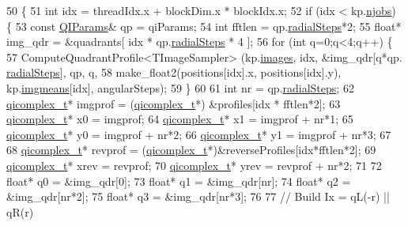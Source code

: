 \begin{DoxyCode}
50 \{
51     \textcolor{keywordtype}{int} idx = threadIdx.x + blockDim.x * blockIdx.x;
52     \textcolor{keywordflow}{if} (idx < kp.\hyperlink{struct_base_kernel_params_aec40d44810d0e0a6640c66038af1fbf2}{njobs}) \{
53         \textcolor{keyword}{const} \hyperlink{struct_q_i_params}{QIParams}& qp = qiParams;
54         \textcolor{keywordtype}{int} fftlen = qp.\hyperlink{struct_q_i_params_a19b7d550113364de4e4f11e2c9cfea0e}{radialSteps}*2;
55         \textcolor{keywordtype}{float}* img\_qdr = &quadrants[ idx * qp.\hyperlink{struct_q_i_params_a19b7d550113364de4e4f11e2c9cfea0e}{radialSteps} * 4 ];
56         \textcolor{keywordflow}{for} (\textcolor{keywordtype}{int} q=0;q<4;q++) \{
57             ComputeQuadrantProfile<TImageSampler> (kp.\hyperlink{struct_base_kernel_params_abdd6b8722cb871a13069ba0e3cd3ab0b}{images}, idx, &img\_qdr[q*qp.
      \hyperlink{struct_q_i_params_a19b7d550113364de4e4f11e2c9cfea0e}{radialSteps}], qp, q, 
58                 make\_float2(positions[idx].x, positions[idx].y), kp.\hyperlink{struct_base_kernel_params_aa0c58be6d25ab55207ca83bb0047f4d9}{imgmeans}[idx], angularSteps);
59         \}
60 
61         \textcolor{keywordtype}{int} nr = qp.\hyperlink{struct_q_i_params_a19b7d550113364de4e4f11e2c9cfea0e}{radialSteps};
62         \hyperlink{_q_i_8h_ad57806420787f160bbbe768dbd72d115}{qicomplex\_t}* imgprof = (\hyperlink{_q_i_8h_ad57806420787f160bbbe768dbd72d115}{qicomplex\_t}*) &profiles[idx * fftlen*2];
63         \hyperlink{_q_i_8h_ad57806420787f160bbbe768dbd72d115}{qicomplex\_t}* x0 = imgprof;
64         \hyperlink{_q_i_8h_ad57806420787f160bbbe768dbd72d115}{qicomplex\_t}* x1 = imgprof + nr*1;
65         \hyperlink{_q_i_8h_ad57806420787f160bbbe768dbd72d115}{qicomplex\_t}* y0 = imgprof + nr*2;
66         \hyperlink{_q_i_8h_ad57806420787f160bbbe768dbd72d115}{qicomplex\_t}* y1 = imgprof + nr*3;
67 
68         \hyperlink{_q_i_8h_ad57806420787f160bbbe768dbd72d115}{qicomplex\_t}* revprof = (\hyperlink{_q_i_8h_ad57806420787f160bbbe768dbd72d115}{qicomplex\_t}*)&reverseProfiles[idx*fftlen*2];
69         \hyperlink{_q_i_8h_ad57806420787f160bbbe768dbd72d115}{qicomplex\_t}* xrev = revprof;
70         \hyperlink{_q_i_8h_ad57806420787f160bbbe768dbd72d115}{qicomplex\_t}* yrev = revprof + nr*2;
71 
72         \textcolor{keywordtype}{float}* q0 = &img\_qdr[0];
73         \textcolor{keywordtype}{float}* q1 = &img\_qdr[nr];
74         \textcolor{keywordtype}{float}* q2 = &img\_qdr[nr*2];
75         \textcolor{keywordtype}{float}* q3 = &img\_qdr[nr*3];
76 
77         \textcolor{comment}{// Build Ix = qL(-r) || qR(r)}

\end{DoxyCode}
